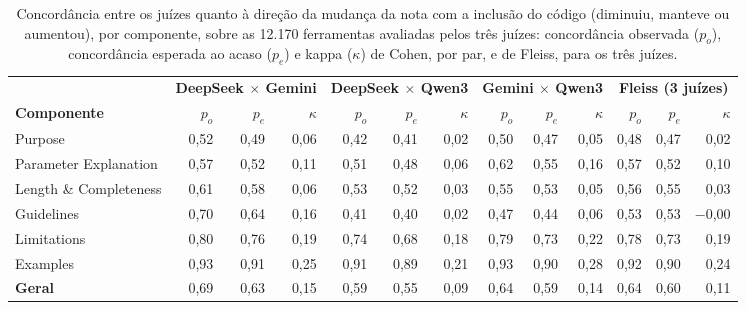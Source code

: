 \begin{table}[H]
\centering
\caption{Concordância entre os juízes quanto à direção da mudança da nota com a inclusão do código (diminuiu, manteve ou aumentou), por componente, sobre as 12.170 ferramentas avaliadas pelos três juízes: concordância observada ($p_o$), concordância esperada ao acaso ($p_e$) e kappa ($\kappa$) de Cohen, por par, e de Fleiss, para os três juízes.}
\label{tab:kappa-direcao}
\scriptsize
\setlength{\tabcolsep}{2.5pt}
\begin{tabular}{lrrrrrrrrrrrr}
\toprule
 & \multicolumn{3}{c}{\textbf{DeepSeek $\times$ Gemini}} & \multicolumn{3}{c}{\textbf{DeepSeek $\times$ Qwen3}} & \multicolumn{3}{c}{\textbf{Gemini $\times$ Qwen3}} & \multicolumn{3}{c}{\textbf{Fleiss (3 juízes)}} \\
\cmidrule(lr){2-4} \cmidrule(lr){5-7} \cmidrule(lr){8-10} \cmidrule(lr){11-13}
\textbf{Componente} & $p_o$ & $p_e$ & $\kappa$ & $p_o$ & $p_e$ & $\kappa$ & $p_o$ & $p_e$ & $\kappa$ & $p_o$ & $p_e$ & $\kappa$ \\
\midrule
Purpose & 0,52 & 0,49 & 0,06 & 0,42 & 0,41 & 0,02 & 0,50 & 0,47 & 0,05 & 0,48 & 0,47 & 0,02 \\
Parameter Explanation & 0,57 & 0,52 & 0,11 & 0,51 & 0,48 & 0,06 & 0,62 & 0,55 & 0,16 & 0,57 & 0,52 & 0,10 \\
Length \& Completeness & 0,61 & 0,58 & 0,06 & 0,53 & 0,52 & 0,03 & 0,55 & 0,53 & 0,05 & 0,56 & 0,55 & 0,03 \\
Guidelines & 0,70 & 0,64 & 0,16 & 0,41 & 0,40 & 0,02 & 0,47 & 0,44 & 0,06 & 0,53 & 0,53 & $-$0,00 \\
Limitations & 0,80 & 0,76 & 0,19 & 0,74 & 0,68 & 0,18 & 0,79 & 0,73 & 0,22 & 0,78 & 0,73 & 0,19 \\
Examples & 0,93 & 0,91 & 0,25 & 0,91 & 0,89 & 0,21 & 0,93 & 0,90 & 0,28 & 0,92 & 0,90 & 0,24 \\
\midrule
\textbf{Geral} & 0,69 & 0,63 & 0,15 & 0,59 & 0,55 & 0,09 & 0,64 & 0,59 & 0,14 & 0,64 & 0,60 & 0,11 \\
\bottomrule
\end{tabular}
\end{table}
